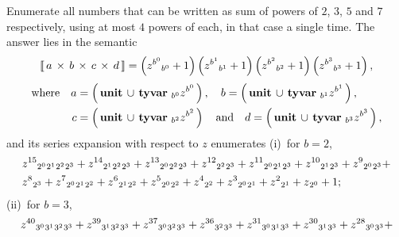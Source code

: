 \begin{example}
Enumerate all numbers that can be written as sum of powers of $2$, $3$, $5$ and
$7$ respectively, using at most $4$ powers of each, in that case a single time.
The answer lies in the semantic
\begin{displaymath}
\left\llbracket\,a\,\times\,b\,\times\,c\,\times\,d\,\right\rrbracket = \left(z^{b^{0}} {\space}_{b^{0}} + 1\right) \left(z^{b^{1}} {\space}_{b^{1}} + 1\right) \left(z^{b^{2}} {\space}_{b^{2}} + 1\right) \left(z^{b^{3}} {\space}_{b^{3}} + 1\right),
\end{displaymath}
\begin{displaymath}
\begin{split}
\text{where}\quad
    a &= \left(\,\textbf{unit}\,\cup\,\textbf{tyvar}\,\,{\space}_{b^{0}} z^{b^{0}}\,\right),\quad
        b = \left(\,\textbf{unit}\,\cup\,\textbf{tyvar}\,\,{\space}_{b^{1}} z^{b^{1}}\,\right),\\
    c &= \left(\,\textbf{unit}\,\cup\,\textbf{tyvar}\,\,{\space}_{b^{2}} z^{b^{2}}\,\right)\quad\text{and}\quad
        d = \left(\,\textbf{unit}\,\cup\,\textbf{tyvar}\,\,{\space}_{b^{3}} z^{b^{3}}\,\right),
\end{split}
\end{displaymath}
and its series expansion with respect to $z$ enumerates (i)~for $b=2$,
\begin{displaymath}
\begin{split}
&z^{15} {\space}_{2^{0}} {\space}_{2^{1}} {\space}_{2^{2}} {\space}_{2^{3}} + z^{14} {\space}_{2^{1}} {\space}_{2^{2}} {\space}_{2^{3}} + z^{13} {\space}_{2^{0}} {\space}_{2^{2}} {\space}_{2^{3}} + z^{12} {\space}_{2^{2}} {\space}_{2^{3}} + z^{11} {\space}_{2^{0}} {\space}_{2^{1}} {\space}_{2^{3}} + z^{10} {\space}_{2^{1}} {\space}_{2^{3}} + z^{9} {\space}_{2^{0}} {\space}_{2^{3}} + \\
&z^{8} {\space}_{2^{3}} + z^{7} {\space}_{2^{0}} {\space}_{2^{1}} {\space}_{2^{2}} + z^{6} {\space}_{2^{1}} {\space}_{2^{2}} + z^{5} {\space}_{2^{0}} {\space}_{2^{2}} + z^{4} {\space}_{2^{2}} + z^{3} {\space}_{2^{0}} {\space}_{2^{1}} + z^{2} {\space}_{2^{1}} + z {\space}_{2^{0}} + 1;
\end{split}
\end{displaymath}
(ii)~for $b=3$,
\begin{displaymath}
\begin{split}
&z^{40} {\space}_{3^{0}} {\space}_{3^{1}} {\space}_{3^{2}} {\space}_{3^{3}} + z^{39} {\space}_{3^{1}} {\space}_{3^{2}} {\space}_{3^{3}} + z^{37} {\space}_{3^{0}} {\space}_{3^{2}} {\space}_{3^{3}} + z^{36} {\space}_{3^{2}} {\space}_{3^{3}} + z^{31} {\space}_{3^{0}} {\space}_{3^{1}} {\space}_{3^{3}} + z^{30} {\space}_{3^{1}} {\space}_{3^{3}} + z^{28} {\space}_{3^{0}} {\space}_{3^{3}} + \\

\end{split}
\end{displaymath}
\end{example}
